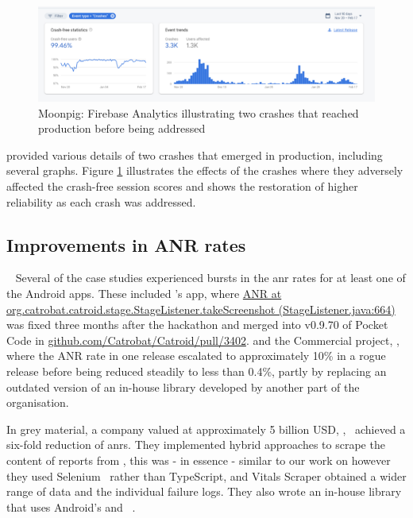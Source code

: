 \begin{figure}
    \centering
    \includegraphics[width=\linewidth]{images/moonpig/firebase_crash_graph_90_days_feb_2020.pdf}
    \caption[Moonpig: Firebase Analytics illustrating two crashes that reached production]{Moonpig: Firebase Analytics illustrating two crashes that reached production before being addressed}
    \label{fig:moonpig-firebase-analytics-two-rogue-crashes}
\end{figure}

 provided various details of two crashes that emerged in production, including several graphs. Figure \ref{fig:moonpig-firebase-analytics-two-rogue-crashes} illustrates the effects of the crashes where they adversely affected the crash-free session scores and shows the restoration of higher reliability as each crash was addressed.


\subsection{Improvements in ANR rates}~\label{aata_improvements_in_anr_rates_topic}
Several of the case studies experienced bursts in the \Gls{anr} rates for at least one of the Android apps. These included 's  app, where 
\href{https://jira.catrob.at/browse/CATROID-411}{ANR at org.catrobat.catroid.stage.StageListener.takeScreenshot (StageListener.java:664)} was fixed three months after the hackathon and merged into v0.9.70 of Pocket Code in \href{https://github.com/Catrobat/Catroid/pull/3402}{github.com/Catrobat/Catroid/pull/3402}. and the Commercial project, , where the ANR rate in one release escalated to approximately 10\% in a rogue release before being reduced steadily to less than 0.4\%, partly by replacing an outdated version of an in-house library developed by another part of the organisation.

In grey material, a company valued at approximately 5 billion USD, ,~
achieved a six-fold reduction of \Glspl{anr}. They implemented hybrid approaches to scrape the content of reports from , this was - in essence - similar to our work on  however they used  Selenium~ rather than TypeScript, and Vitals Scraper obtained a wider range of data and the individual failure logs. They also wrote an in-house library that uses Android's  and ~.

